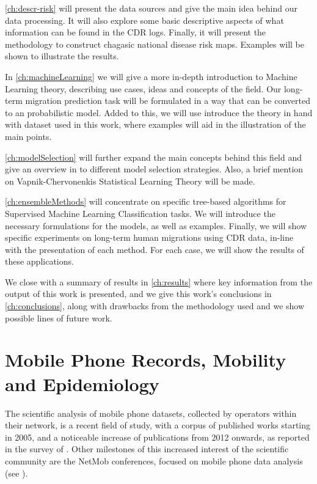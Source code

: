 
\cref{ch:descr-risk} will present the data sources and give the main idea behind our data processing. It will also explore some basic descriptive aspects of what information can be found in the CDR logs.
Finally, it will present the methodology to construct chagasic national disease risk maps.
Examples will be shown to illustrate the results.

In \cref{ch:machineLearning} we will give a more in-depth introduction to Machine Learning theory, describing use cases, ideas and concepts of the field.
Our long-term migration prediction task will be formulated in a way that can be converted to an probabilistic model.
Added to this, we will use introduce the theory in hand with dataset used in this work, where examples will aid in the illustration of the main points.

\cref{ch:modelSelection} will further expand the main concepts behind this field and give an overview in to different model selection strategies.
Also, a brief mention on Vapnik-Chervonenkis Statistical Learning Theory will be made.

\cref{ch:ensembleMethods} will concentrate on specific tree-based algorithms for Supervised Machine Learning Classification tasks.
We will introduce the necessary formulations for the models, as well as examples.
Finally, we will show specific experiments on long-term human migrations using CDR data, in-line with the presentation of each method.
For each case, we will show the results of these applications.

We close with a summary of results in \cref{ch:results} where key information from the output of this work is presented,
and we give this work's conclusions in \cref{ch:conclusions}, along with drawbacks from the methodology used and we show possible lines of future work.


\section{Mobile Phone Records, Mobility and Epidemiology}

The scientific analysis of mobile phone datasets, collected by operators within their network, is a recent field of study, with a corpus of published works starting in 2005, and a noticeable increase of publications from 2012 onwards, as reported in the survey of \cite{naboulsi2015mobile}. Other milestones of this increased interest of the scientific community are the NetMob conferences, focused on mobile phone data analysis (see \cite{netmob}).

